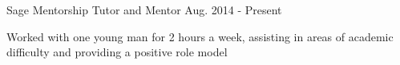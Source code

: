 \begin{cventries}
 
   \cventry
    {Sage Mentorship} %
    {Tutor and Mentor} %
    {Aug. 2014 - Present} %
    {} %
    {
      \begin{cvitems} %
        \item {Worked with one young man for 2 hours a week, assisting in areas of academic difficulty and providing a positive role model}
      \end{cvitems}
     }
\end{cventries}
